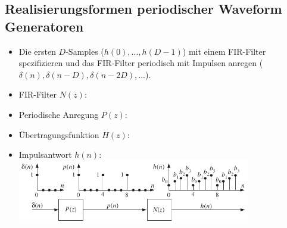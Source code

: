 	\subsection{Realisierungsformen periodischer Waveform Generatoren}
		\begin{itemize}
		 \item Die ersten $D$-Samples ($h(0),...,h(D-1)$) mit einem FIR-Filter spezifizieren und das FIR-Filter periodisch mit Impulsen anregen ($\delta(n),\delta(n-D),\delta(n-2D),...$).
		 \item FIR-Filter $N(z)$:$\qquad\qquad\qquad\,$
		 \item Periodische Anregung $P(z)$:$\;\;\;\;\,$
		 \item Übertragungsfunktion $H(z)$:$\quad$
		 \item Impulsantwort $h(n)$:$\qquad\qquad\;\;\,$
		 \\[0.2cm]
		 \includegraphics[width = 0.8\textwidth]{pic/periodischesDigitalesSignal.pdf}\\[-0.3cm]
		\end{itemize}
		
